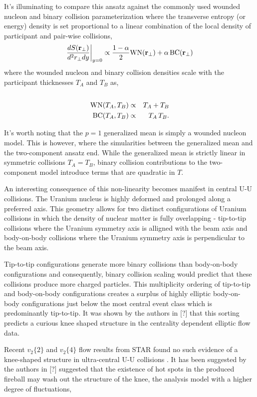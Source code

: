 \documentclass[aps,prl,reprint,amsmath,nofootinbib]{revtex4-1}
\begin{document}
It's illuminating to compare this ansatz against the commonly used wounded nucleon and binary collision parameterization where the transverse entropy (or energy) density 
is set proportional to a linear combination of the local density of participant and pair-wise collisions,
\begin{equation}
 \frac{dS({\bf r}_\perp)}{d^2r_\perp dy} \biggr \rvert_{y=0}  \propto \frac{1-\alpha}{2}\mbox{WN}({\bf r_\perp}) + \alpha\, \mbox{BC}({\bf r_\perp}) 
\end{equation}
where the wounded nucleon and binary collision densities scale with the participant thicknesses $T_A$ and $T_B$ as,
\begin{eqnarray}
 \cr \mbox{WN}(T_A,T_B) &\propto& T_A + T_B \\
 \label{binary collisions}
 \mbox{BC}(T_A,T_B) &\propto& T_A\,T_B.
\end{eqnarray}

It's worth noting that the $p=1$ generalized mean is simply a wounded nucleon model. This is however, where the simularities between the generalized
mean and the two-component ansatz end. While the generalized mean is strictly linear in symmetric collisions $T_A=T_B$, binary collision contributions to the 
two-component model introduce terms that are quadratic in $T$.

An interesting consequence of this non-linearity becomes manifest in central U-U collisions. The Uranium nucleus is highly deformed and prolonged along a preferred 
axis. This geometry allows for two distinct configurations of Uranium collisions in which the density of nuclear matter is fully overlapping - tip-to-tip collisions 
where the Uranium symmetry axis is alligned with the beam axis and body-on-body collisions where the Uranium symmetry axis is perpendicular to the beam axis. 

Tip-to-tip configurations generate more binary collisions than body-on-body configurations and consequently, binary collision scaling would predict that these 
collisions produce more charged particles. This multiplicity ordering of tip-to-tip and body-on-body configurations creates a surplus of highly elliptic 
body-on-body configurations just below the most central event class which is predominantly tip-to-tip. It was shown by the authors in [?] that this sorting predicts 
a curious knee shaped structure in the centrality dependent elliptic flow data. 

Recent $v_2\{2\}$ and $v_2\{4\}$ flow results from STAR found no such evidence of a knee-shaped structure in ultra-central U-U collisions \cite{UU-STAR}. It has been
suggested by the authors in [?] suggested that the existence of hot spots in the produced fireball may wash out the structure of the knee, the analysis model with a higher degree of fluctuations,
\end{document}
